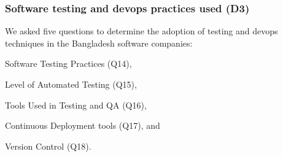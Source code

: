 \subsubsection{Software testing and devops practices used (D3)}
\label{testing_practices}
% 
We asked five questions to determine the adoption of testing and devops techniques in the Bangladesh software companies:
\begin{inparaenum}
\item Software Testing Practices (Q14),
\item Level of Automated Testing (Q15),
\item Tools Used in Testing and QA (Q16),
\item Continuous Deployment tools (Q17), and
\item Version Control (Q18).
\end{inparaenum}

